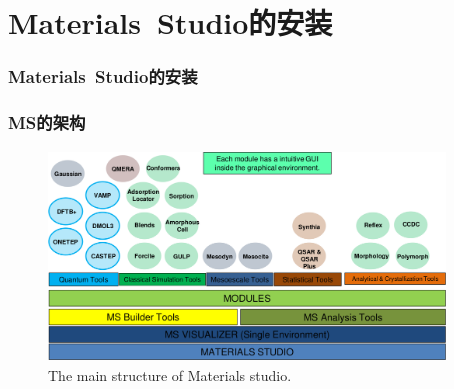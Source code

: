 \small
\section{\rm{Materials~Studio}的安装}
\frame
{
	\frametitle{\textrm{Materials~Studio}的安装}
\begin{figure}[h!]
	\vspace{-10pt}
\centering
\label{Materials-Studio_Install}
\end{figure}
}

\frame
{
	\frametitle{\textrm{MS}的架构}
\begin{figure}[h!]
\centering
\vspace*{-0.10in}
\includegraphics[height=2.20in,width=4.15in,viewport=0 0 1275 667,clip]{Figures/MS-main_Struct.png}
\caption{\tiny \textrm{The main structure of Materials studio.}}%
\label{MS-main-structure}
\end{figure}
}


